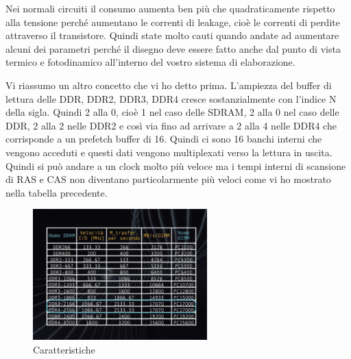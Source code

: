 Nei normali circuiti il consumo aumenta ben più che quadraticamente rispetto alla tensione perché aumentano le correnti di leakage, cioè le correnti di perdite attraverso il transistore.
Quindi state molto cauti quando andate ad aumentare alcuni dei parametri perché il disegno deve essere fatto anche dal punto di vista termico e fotodinamico all'interno del vostro sistema di elaborazione.

Vi riassumo un altro concetto che vi ho detto prima.
L'ampiezza del buffer di lettura delle DDR, DDR2, DDR3, DDR4 cresce sostanzialmente con l'indice N della sigla.
Quindi 2 alla 0, cioè 1 nel caso delle SDRAM, 2 alla 0 nel caso delle DDR, 2 alla 2 nelle DDR2 e così via fino ad arrivare a 2 alla 4 nelle DDR4 che corrisponde a un prefetch buffer di 16.
Quindi ci sono 16 banchi interni che vengono acceduti e questi dati vengono multiplexati verso la lettura in uscita.
Quindi si può andare a un clock molto più veloce ma i tempi interni di scansione di RAS e CAS non diventano particolarmente più veloci come vi ho mostrato nella tabella precedente.

\FloatBarrier
\begin{figure}[H]
  \centering
  \includegraphics[width=0.60\textwidth,
                    trim=40 40 20 50, %
                    clip]
                    {images/Lez05_p02_fig_04.png}
  \caption{Caratteristiche}
  \label{fig:Lez05_p02_fig_04}
\end{figure}
\FloatBarrier
\noindent

